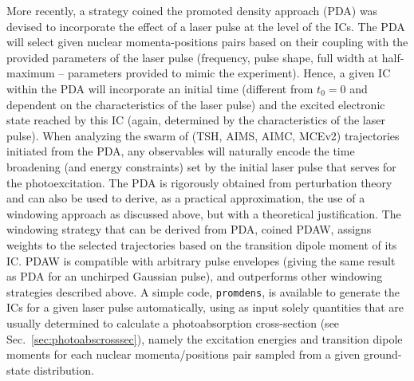 \documentclass[9pt,bestpractices]{livecoms}
\begin{document}
More recently, a strategy coined the promoted density approach (PDA) was devised to incorporate the effect of a laser pulse at the level of the ICs.\cite{janos2024including} The PDA will select given nuclear momenta-positions pairs based on their coupling with the provided parameters of the laser pulse (frequency, pulse shape, full width at half-maximum -- parameters provided to mimic the experiment). Hence, a given IC within the PDA will incorporate an initial time (different from $t_0=0$ and dependent on the characteristics of the laser pulse) and the excited electronic state reached by this IC (again, determined by the characteristics of the laser pulse). When analyzing the swarm of (TSH, AIMS, AIMC, MCEv2) trajectories initiated from the PDA, any observables will naturally encode the time broadening (and energy constraints) set by the initial laser pulse that serves for the photoexcitation.   
The PDA is rigorously obtained from perturbation theory and can also be used to derive, as a practical approximation, the use of a windowing approach as discussed above, but with a theoretical justification. The windowing strategy that can be derived from PDA, coined PDAW, assigns weights to the selected trajectories based on the transition dipole moment of its IC. PDAW is compatible with arbitrary pulse envelopes (giving the same result as PDA for an unchirped Gaussian pulse), and outperforms other windowing strategies described above. A simple code, \texttt{promdens},\cite{promdens} is available to generate the ICs for a given laser pulse automatically, using as input solely quantities that are usually determined to calculate a photoabsorption cross-section (see Sec.~\ref{sec:photoabscrosssec}), namely the excitation energies and transition dipole moments for each nuclear momenta/positions pair sampled from a given ground-state distribution.
\end{document}
